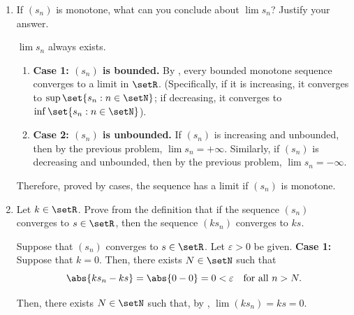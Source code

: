 \begin{enumerate}
\begin{subprove}
    Since the sequence is decreasing, for all \(n > N\), 
    \[
      s_n \le s_N < -M \quad\text{for all } n > N.
    \]
    Thus, by definition of divergence to negative infinity, \(\lim s_n = -\infty\).
  \end{subprove}
  \item If \((s_n)\) is monotone, what can you conclude about \(\lim s_n\)? Justify your answer.
  \begin{subanswer}
    \(\lim s_n\) always exists.
    \begin{enumerate}
      \item \textbf{Case 1: \((s_n)\) is bounded.}
      By , every 
      bounded monotone sequence converges to a limit in \(\setR\).
      (Specifically, if it is increasing, it converges to 
      \(\sup\set{s_n : n \in \setN}\); if decreasing, 
      it converges to \(\inf\set{s_n : n \in \setN}\)).
      \item \textbf{Case 2: \((s_n)\) is unbounded.}
      If \((s_n)\) is increasing and unbounded, 
      then by the previous problem, \(\lim s_n = +\infty\).
      Similarly, if \((s_n)\) is decreasing and unbounded, 
      then by the previous problem, \(\lim s_n = -\infty\).
    \end{enumerate}
    Therefore, proved by cases, the sequence has a limit if \((s_n)\) is monotone.
  \end{subanswer}
  \item Let \(k \in \setR\). Prove from the definition that if the sequence \((s_n)\) 
  converges to \(s \in \setR\), then the sequence \((k s_n)\) converges to \(k s\).
  \begin{subprove}
    Suppose that \((s_n)\) converges to \(s \in \setR\).
    Let \(\varepsilon > 0\) be given.\proofstep
    \textbf{Case 1:} Suppose that \(k = 0\).
    Then, there exists \(N \in \setN\) such that
    \[
      \abs{k s_n - k s} = \abs{0 - 0} = 0 < \varepsilon \quad\text{for all } n > N.
    \]
    
    Then, there exists \(N \in \setN\) such that, by , \(\lim (k s_n)= k s = 0 \).
    

\end{subprove}
\end{enumerate}
